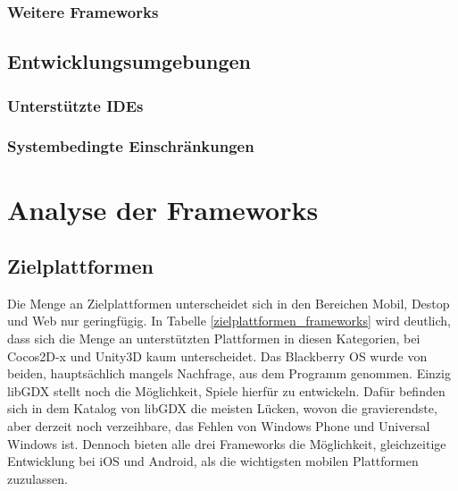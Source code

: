 \subsection{Weitere Frameworks}
\section{Entwicklungsumgebungen}
\subsection{Unterstützte IDEs}
\subsection{Systembedingte Einschränkungen}

\chapter{Analyse der Frameworks}


\section{Zielplattformen}
Die Menge an Zielplattformen unterscheidet sich in den Bereichen Mobil, Destop und Web nur geringfügig. In Tabelle \ref{zielplattformen_frameworks} wird deutlich, dass sich die Menge an unterstützten Plattformen in diesen Kategorien, bei Cocos2D-x und Unity3D kaum unterscheidet. Das Blackberry OS wurde von beiden, hauptsächlich mangels Nachfrage, aus dem Programm genommen. Einzig libGDX stellt noch die Möglichkeit, Spiele hierfür zu entwickeln. Dafür befinden sich in dem Katalog von libGDX die meisten Lücken, wovon die gravierendste, aber derzeit noch verzeihbare, das Fehlen von Windows Phone und Universal Windows ist. Dennoch bieten alle drei Frameworks die Möglichkeit, gleichzeitige Entwicklung bei iOS und Android, als die wichtigsten mobilen Plattformen zuzulassen. 

